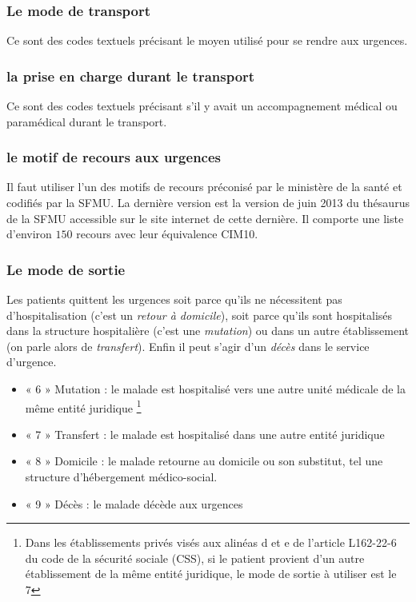 \documentclass[12pt,english,french,twoside]{book}\usepackage[]{graphicx}\usepackage[]{color}
\begin{document}
\subsubsection{Le mode de transport}

Ce sont des codes textuels précisant le moyen utilisé pour se rendre aux urgences.

\subsubsection{la prise en charge durant le transport}

Ce sont des codes textuels précisant s'il y avait un accompagnement médical ou paramédical durant le transport.

\subsubsection{le motif de recours aux urgences}

Il faut utiliser l'un des motifs de recours préconisé par le ministère de la santé \cite{13} et codifiés par la SFMU. La dernière version est la version de juin 2013 du thésaurus de la SFMU accessible sur le site internet de cette dernière. Il comporte une liste d'environ $150$ recours avec leur équivalence CIM10.


\subsubsection{Le mode de sortie}

\label{ref:sortie}
Les patients quittent les urgences soit parce qu'ils ne nécessitent pas d'hospitalisation (c'est un \emph{retour à domicile}), soit parce qu'ils sont hospitalisés dans la structure hospitalière (c'est une \emph{mutation}) ou dans un autre établissement (on parle alors de \emph{transfert}). Enfin il peut s'agir d'un \emph{décès} dans le service d'urgence.

\begin{itemize}
  \item « 6 » Mutation : le malade est hospitalisé vers une autre unité médicale de la même
entité juridique \footnote{Dans les établissements privés visés aux alinéas d et e de l'article L162-22-6 du code de la sécurité sociale (CSS), si le patient provient d’un autre établissement de la même entité juridique, le mode de sortie à utiliser est le 7}
  \item « 7 » Transfert : le malade est hospitalisé dans une autre entité juridique
  \item « 8 » Domicile : le malade retourne au domicile ou son substitut, tel une
structure d'hébergement médico-social.
  \item « 9 » Décès : le malade décède aux urgences
\end{itemize}
\end{document}
